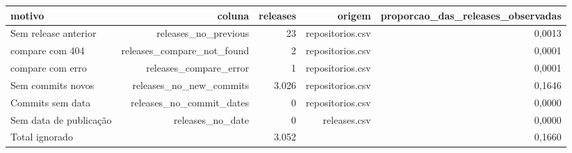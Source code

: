 \begin{tabular}{lrrrr}
\hline
motivo & coluna & releases & origem & proporcao\_das\_releases\_observadas \\
\hline
Sem release anterior & releases\_no\_previous & 23 & repositorios.csv & 0,0013 \\
compare com 404 & releases\_compare\_not\_found & 2 & repositorios.csv & 0,0001 \\
compare com erro & releases\_compare\_error & 1 & repositorios.csv & 0,0001 \\
Sem commits novos & releases\_no\_new\_commits & 3.026 & repositorios.csv & 0,1646 \\
Commits sem data & releases\_no\_commit\_dates & 0 & repositorios.csv & 0,0000 \\
Sem data de publicação & releases\_no\_date & 0 & releases.csv & 0,0000 \\
Total ignorado &  & 3.052 &  & 0,1660 \\
\hline
\end{tabular}
